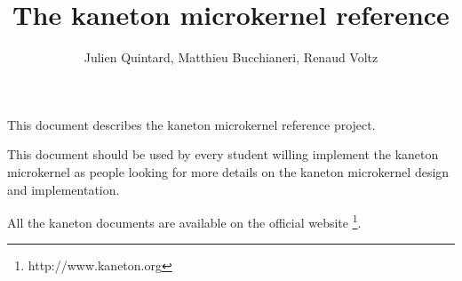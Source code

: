 
%
%



%
%

\rhead{}

%
%

\title{The kaneton microkernel reference
       \logos}

%
%

\author{\small{Julien Quintard},
        \small{Matthieu Bucchianeri},
        \small{Renaud Voltz}}

%
%



%
%

\maketitle

%
%

%
%

This document describes the kaneton microkernel reference project.

This document should be used by every student willing implement the
kaneton microkernel as people looking for more details on the kaneton
microkernel design and implementation.

All the kaneton documents are available on
the official website
  \footnote{http://www.kaneton.org}.

%
%

\tableofcontents

%
%









%

%

%
%
%



